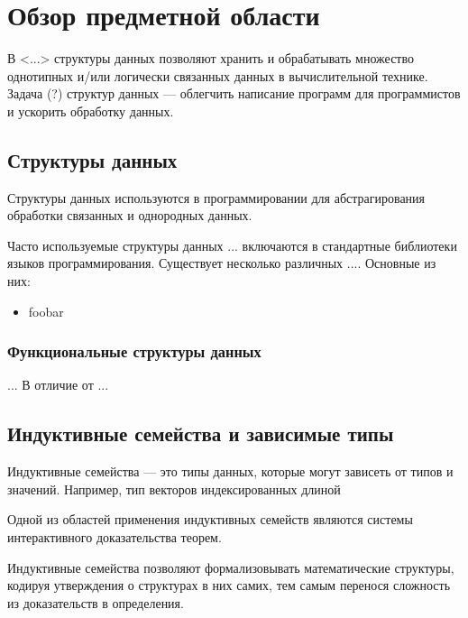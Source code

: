 \chapter{Обзор предметной области}
\label{chapter1}

В <...> структуры данных позволяют хранить и обрабатывать множество однотипных 
и/или логически связанных данных в вычислительной технике.
Задача (?) структур данных — облегчить написание программ для программистов и
ускорить обработку данных.

\section{Структуры данных}
Структуры данных используются в программировании для абстрагирования
обработки связанных и однородных данных.


Часто используемые структуры данных ... включаются в стандартные библиотеки
языков программирования.
Существует несколько различных .... Основные из них:
\begin{itemize}
 \item foobar
\end{itemize}

\subsection{Функциональные структуры данных}
...
В отличие от ...



\section{Индуктивные семейства и зависимые типы}

Индуктивные семейства — это типы данных, которые могут зависеть от типов и значений. Например, тип векторов индексированных длиной 



Одной из областей применения индуктивных семейств являются системы интерактивного
доказательства теорем.

Индуктивные семейства позволяют формализовывать математические структуры,
кодируя утверждения о структурах в них самих, тем самым перенося сложность из
доказательств в определения.

